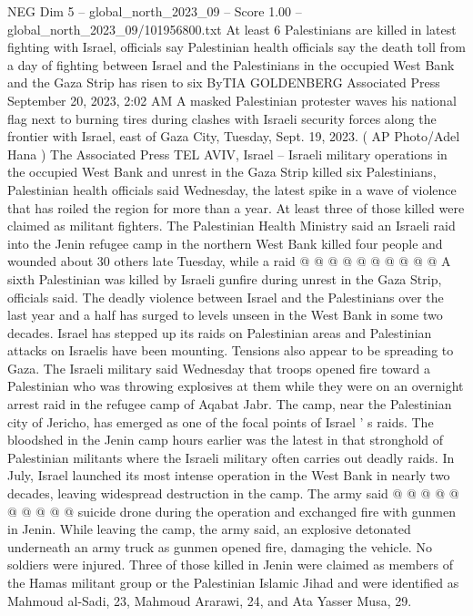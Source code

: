 \begin{textsample}{NEG Dim 5 – global\_north\_2023\_09 – Score 1.00 – global\_north\_2023\_09/101956800.txt}  \label{ex:f5_neg_012}
At least 6 Palestinians are killed in latest fighting with Israel, officials say Palestinian health officials say the death toll from a day of fighting between Israel and the Palestinians in the occupied West Bank and the Gaza Strip has risen to six ByTIA GOLDENBERG Associated Press September 20, 2023, 2:02 AM A masked Palestinian protester waves his national flag next to burning tires during clashes with Israeli security forces along the frontier with Israel, east of Gaza City, Tuesday, Sept. 19, 2023. ( AP Photo/Adel Hana ) The Associated Press TEL AVIV, Israel -- Israeli military operations in the occupied West Bank and unrest in the Gaza Strip killed six Palestinians, Palestinian health officials said Wednesday, the latest spike in a wave of violence that has roiled the region for more than a year.
At least three of those killed were claimed as militant fighters.
The Palestinian Health Ministry said an Israeli raid into the Jenin refugee camp in the northern West Bank killed four people and wounded about 30 others late Tuesday, while a raid @ @ @ @ @ @ @ @ @ @ A sixth Palestinian was killed by Israeli gunfire during unrest in the Gaza Strip, officials said.
The deadly violence between Israel and the Palestinians over the last year and a half has surged to levels unseen in the West Bank in some two decades.
Israel has stepped up its raids on Palestinian areas and Palestinian attacks on Israelis have been mounting.
Tensions also appear to be spreading to Gaza.
The Israeli military said Wednesday that troops opened fire toward a Palestinian who was throwing explosives at them while they were on an overnight arrest raid in the refugee camp of Aqabat Jabr.
The camp, near the Palestinian city of Jericho, has emerged as one of the focal points of Israel ' s raids.
The bloodshed in the Jenin camp hours earlier was the latest in that stronghold of Palestinian militants where the Israeli military often carries out deadly raids.
In July, Israel launched its most intense operation in the West Bank in nearly two decades, leaving widespread destruction in the camp.
The army said @ @ @ @ @ @ @ @ @ @ suicide drone during the operation and exchanged fire with gunmen in Jenin.
While leaving the camp, the army said, an explosive detonated underneath an army truck as gunmen opened fire, damaging the vehicle.
No soldiers were injured.
Three of those killed in Jenin were claimed as members of the Hamas militant group or the Palestinian Islamic Jihad and were identified as Mahmoud al-Sadi, 23, Mahmoud Ararawi, 24, and Ata Yasser Musa, 29.

\end{textsample}

